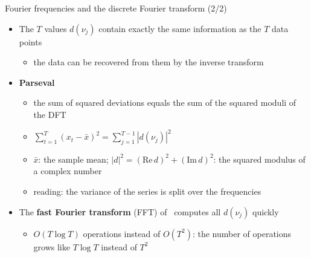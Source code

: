 \begin{frame}{Fourier frequencies and the discrete Fourier transform (2/2)}
\itemsize{\small}
\begin{itemize}
    \item The $T$ values $d(\nu_j)$ contain exactly the same information as the $T$ data points
    \begin{itemize}
        \item the data can be recovered from them by the inverse transform
    \end{itemize}
    \item \textbf{Parseval}
    \begin{itemize}
        \item the sum of squared deviations equals the sum of the squared moduli of the DFT
        \item $\sum_{t=1}^{T}(x_t - \bar x)^2 = \sum_{j=1}^{T-1}|d(\nu_j)|^2$
        \item $\bar x$: the sample mean; $|d|^2 = (\mathrm{Re}\,d)^2 + (\mathrm{Im}\,d)^2$: the squared modulus of a complex number
        \item reading: the variance of the series is split over the frequencies
    \end{itemize}
    \item The \textbf{fast Fourier transform} (FFT) of \ computes all $d(\nu_j)$ quickly
    \begin{itemize}
        \item $O(T\log T)$ operations instead of $O(T^2)$: the number of operations grows like $T\log T$ instead of $T^2$
    \end{itemize}
\end{itemize}
\end{frame}

